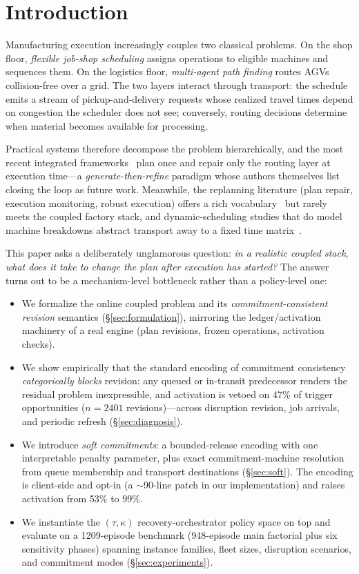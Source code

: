 \documentclass[twocolumn]{article}
\begin{document}
\section{Introduction}
Manufacturing execution increasingly couples two classical problems.
On the shop floor, \emph{flexible job-shop scheduling} assigns operations
to eligible machines and sequences them. On the logistics floor,
\emph{multi-agent path finding} routes AGVs collision-free over a grid.
The two layers interact through transport: the schedule emits a stream of
pickup-and-delivery requests whose realized travel times depend on
congestion the scheduler does not see; conversely, routing decisions
determine when material becomes available for processing.

Practical systems therefore decompose the problem hierarchically, and the
most recent integrated frameworks~\cite{li2026framework} plan once and
repair only the routing layer at execution time---a
\emph{generate-then-refine} paradigm whose authors themselves list
closing the loop as future work. Meanwhile, the replanning literature
(plan repair, execution monitoring, robust execution) offers a rich
vocabulary~\cite{fox2006plan,domshlak2013satisficing} but rarely meets
the coupled factory stack, and dynamic-scheduling studies that do model
machine breakdowns abstract transport away to a fixed time
matrix~\cite{lu2025dynamic}.

This paper asks a deliberately unglamorous question: \emph{in a realistic
coupled stack, what does it take to change the plan after execution has
started?} The answer turns out to be a mechanism-level bottleneck rather
than a policy-level one:

\begin{itemize}
\item We formalize the online coupled problem and its
  \emph{commitment-consistent revision} semantics
  (\S\ref{sec:formulation}), mirroring the ledger/activation machinery of
  a real engine (plan revisions, frozen operations, activation checks).
\item We show empirically that the standard encoding of commitment
  consistency \emph{categorically blocks} revision: any queued or
  in-transit predecessor renders the residual problem inexpressible, and
  activation is vetoed on 47\% of trigger opportunities ($n{=}2401$
  revisions)---across disruption revision, job arrivals, and periodic
  refresh (\S\ref{sec:diagnosis}).
\item We introduce \emph{soft commitments}: a bounded-release encoding
  with one interpretable penalty parameter, plus exact commitment-machine
  resolution from queue membership and transport destinations
  (\S\ref{sec:soft}). The encoding is client-side and opt-in (a
  $\sim$90-line patch in our implementation) and raises activation from
  53\% to 99\%.
\item We instantiate the $(\tau,\kappa)$ recovery-orchestrator policy
  space on top and evaluate on a 1209-episode benchmark (948-episode
  main factorial plus six sensitivity phases) spanning instance families,
  fleet sizes, disruption scenarios, and commitment modes
  (\S\ref{sec:experiments}).
\end{itemize}
\end{document}
